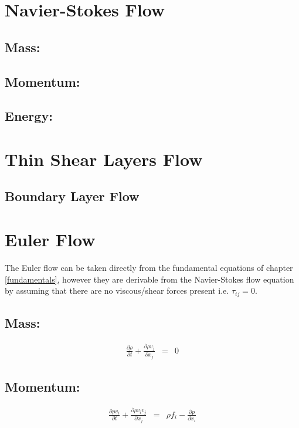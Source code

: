 \newpage
\section{Navier-Stokes Flow}

\subsection*{Mass:}

\subsection*{Momentum:}

\subsection*{Energy:}







\newpage
\section{Thin Shear Layers Flow}

\subsection{Boundary Layer Flow}








\newpage
\section{Euler Flow}
The Euler flow can be taken directly from the fundamental equations of chapter \ref{fundamentals}, however they are derivable from the Navier-Stokes flow equation by assuming that there are no viscous/shear forces present i.e. $\tau_{ij}=0$. 
\subsection*{Mass:}
\begin{eqnarray}        
    \frac{\partial \rho}{\partial t} +  \frac{\partial \rho v_j}{\partial x_j} &=& 0 
\end{eqnarray}        

\subsection*{Momentum:}
\begin{eqnarray}        
    \frac{\partial \rho v_i}{\partial t} +  \frac{\partial \rho v_i v_j}{\partial x_j} &=& \rho f_i - \frac{\partial p}{\partial x_i} 
\end{eqnarray}        

